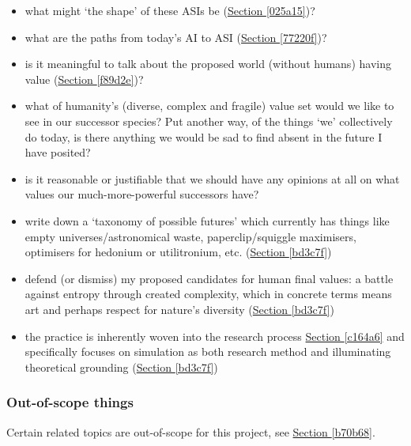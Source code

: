 \documentclass{article}
\begin{document}
\begin{itemize}
\item what might `the shape' of these ASIs be (\hyperref[025a15]{Section \ref*{025a15}})?
\item what are the paths from today's AI to ASI (\hyperref[77220f]{Section \ref*{77220f}})?
\item is it meaningful to talk about the proposed world (without humans) having value (\hyperref[f89d2e]{Section \ref*{f89d2e}})?
\item what of humanity's (diverse, complex and fragile) value set would we like to see in our successor species?  Put another way, of the things `we' collectively do today, is there anything we would be sad to find absent in the future I have posited?
\item is it reasonable or justifiable that we should have any opinions at all on what values our much-more-powerful successors have?
\item write down a `taxonomy of possible futures' which currently has things like empty universes/astronomical waste, paperclip/squiggle maximisers, optimisers for hedonium or utilitronium, etc. (\hyperref[bd3c7f]{Section \ref*{bd3c7f}})
\item defend (or dismiss) my proposed candidates for human final values: a battle against entropy through created complexity, which in concrete terms means art and perhaps respect for nature's diversity (\hyperref[bd3c7f]{Section \ref*{bd3c7f}})
\item the practice is inherently woven into the research process \hyperref[c164a6]{Section \ref*{c164a6}} and specifically focuses on simulation as both research method and illuminating theoretical grounding (\hyperref[bd3c7f]{Section \ref*{bd3c7f}})
\end{itemize}

\subsubsection{Out-of-scope things}

Certain related topics are out-of-scope for this project, see \hyperref[b70b68]{Section \ref*{b70b68}}.
\end{document}
